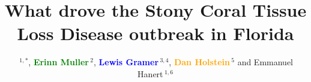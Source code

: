 \documentclass[utf8]{frontiersSCNS}
\newcommand{\erinn}[1]{\textbf{\textcolor{green}{#1}}}
\newcommand{\lew}[1]{\textbf{\textcolor{blue}{#1}}}
\newcommand{\dan}[1]{\textbf{\textcolor{orange}{#1}}}
\newcommand{\dobby}[1]{\textbf{\color{violet}{#1}}}
\def\firstAuthorLast{Dobbelaere {et~al.}} %
\def\Authors{\dobby{Thomas Dobbelaere}\,$^{1,*}$, \erinn{Erinn Muller}\,$^{2}$, \lew{Lewis Gramer}\,$^{3,4}$, \dan{Dan Holstein}\,$^{5}$  and Emmanuel Hanert\,$^{1,6}$}
\begin{document}
\onecolumn
{}

\title[What drove the SCTLD outbreak in Florida]{What drove the Stony Coral Tissue Loss Disease outbreak in Florida}

\author[\firstAuthorLast ]{\Authors} %
\address{} %
\correspondance{} %
\extraAuth{}

\maketitle
\end{document}
